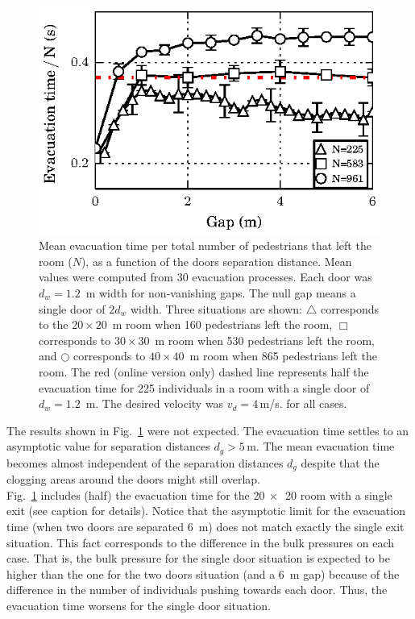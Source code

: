 \begin{figure}
\includegraphics[width=\columnwidth]{./fig9.eps}
\caption{\label{fig:1} Mean evacuation time per total number of pedestrians 
that left the room ($N$), as a function of the doors separation distance. Mean 
values were computed from 30 evacuation processes. Each door was $d_w=1.2$~m 
width for non-vanishing gaps. The null gap means a single door of $2d_w$ width. 
Three situations are shown: $\bigtriangleup$ corresponds to the $20\times20$~m 
room when 160 pedestrians left the room, $\Box$ corresponds to $30\times30$~m 
room when 530 pedestrians left the room, and $\bigcirc$ corresponds to 
$40\times40$~m room when  865 pedestrians left the room.  {\color{red} The red (online version only) dashed line represents half the evacuation time for 225 individuals in a room with a single door of $d_w=1.2$~m. The desired velocity  was $v_d=4\,$m/s. for all cases.}}
\end{figure}

The results shown in Fig.~\ref{fig:1} were not expected. The evacuation time 
settles to an asymptotic value for separation distances $d_g>5\,$m. The mean 
evacuation time becomes almost independent of the separation distances $d_g$ 
despite that the clogging areas around the doors might still overlap.  \\ 

{\color{red} Fig.~\ref{fig:1} includes (half) the  evacuation time for the 20$~\times$~20 room with a single exit (see caption for details). Notice that the asymptotic limit for the evacuation time (when two doors are separated 6~m) does not match exactly the single exit situation. This fact corresponds to the difference in the bulk pressures on each case. That is, the bulk pressure for the single door situation is expected to be higher than the one for the two doors situation (and a 6~m gap) because of the difference in the number of individuals pushing towards each door. Thus, the evacuation time worsens for the single door situation.}\\

